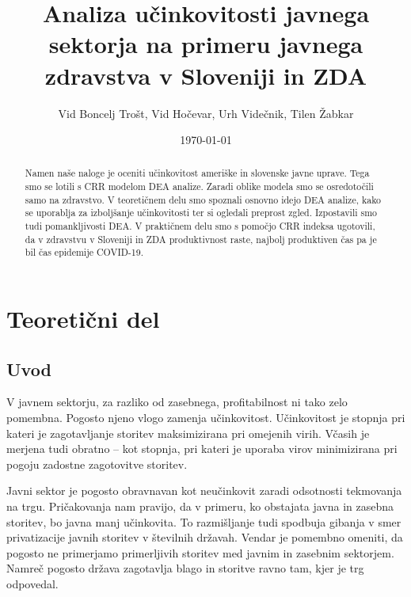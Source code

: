 \documentclass[12pt,a4paper]{article}
\theoremstyle{definition}
\begin{document}
\setlength{\parskip}{1em}
\setlength{\parindent}{0pt}

\title{Analiza učinkovitosti javnega sektorja na primeru javnega zdravstva v Sloveniji in ZDA}
\author{Vid Boncelj Trošt, Vid Hočevar, Urh Videčnik, Tilen Žabkar}
\date{\today}
\maketitle

\begin{abstract}
    Namen naše naloge je oceniti učinkovitost ameriške in slovenske javne
    uprave. Tega smo se lotili s CRR modelom DEA analize. Zaradi oblike modela
    smo se osredotočili samo na zdravstvo. V teoretičnem
    delu smo spoznali osnovno idejo DEA analize, kako se uporablja za 
    izboljšanje učinkovitosti ter si ogledali preprost zgled. Izpostavili
    smo tudi pomankljivosti DEA. V praktičnem delu smo s pomočjo CRR indeksa
    ugotovili, da v zdravstvu v Sloveniji in ZDA produktivnost raste, najbolj
    produktiven čas pa je bil čas epidemije COVID-19. 
\end{abstract}

\newpage

\tableofcontents

\section{Teoretični del}

\subsection{Uvod}

V javnem sektorju, za razliko od zasebnega, profitabilnost
ni tako zelo pomembna. Pogosto njeno vlogo zamenja učinkovitost. 
Učinkovitost je stopnja pri kateri je zagotavljanje storitev maksimizirana pri omejenih 
virih. Včasih je merjena tudi obratno -- kot stopnja, pri kateri je uporaba virov 
minimizirana pri pogoju zadostne zagotovitve storitev. 

Javni sektor je pogosto obravnavan kot neučinkovit zaradi odsotnosti
tekmovanja na trgu. Pričakovanja nam pravijo, da v primeru, ko obstajata
javna in zasebna storitev, bo javna manj učinkovita. To razmišljanje tudi
spodbuja gibanja v smer privatizacije javnih storitev v številnih državah.
Vendar je pomembno omeniti, da pogosto ne primerjamo primerljivih
storitev med javnim in zasebnim sektorjem. Namreč 
pogosto država zagotavlja blago in storitve ravno tam, kjer je trg odpovedal.
\cite{Lovell2002}
\end{document}
